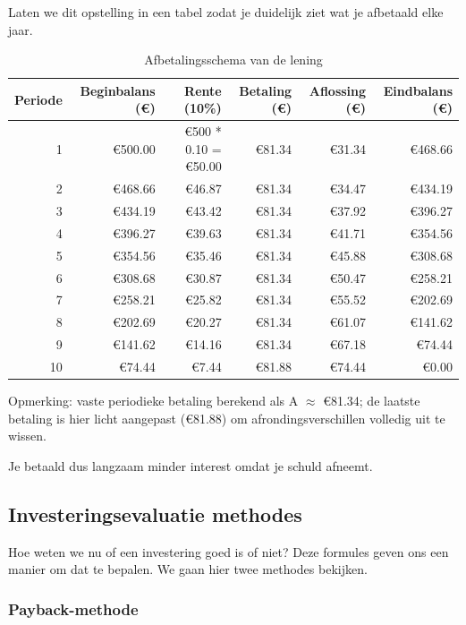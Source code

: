 \documentclass[a4paper,11pt]{article}
\begin{document}
    Laten we dit opstelling in een tabel zodat je duidelijk ziet wat je afbetaald elke jaar.
    \begin{table}[H]
        \centering
        \caption{Afbetalingsschema van de lening}
        \begin{tabular}{r r r r r r}
            \toprule
            Periode & Beginbalans (€) & Rente (10\%) & Betaling (€) & Aflossing (€) & Eindbalans (€) \\ 
            \midrule
            1  & €500.00 & €500 * 0.10 = €50.00 & €81.34 & €31.34 & €468.66 \\
            2  & €468.66 & €46.87 & €81.34 & €34.47 & €434.19 \\
            3  & €434.19 & €43.42 & €81.34 & €37.92 & €396.27 \\
            4  & €396.27 & €39.63 & €81.34 & €41.71 & €354.56 \\
            5  & €354.56 & €35.46 & €81.34 & €45.88 & €308.68 \\
            6  & €308.68 & €30.87 & €81.34 & €50.47 & €258.21 \\
            7  & €258.21 & €25.82 & €81.34 & €55.52 & €202.69 \\
            8  & €202.69 & €20.27 & €81.34 & €61.07 & €141.62 \\
            9  & €141.62 & €14.16 & €81.34 & €67.18 & €74.44 \\
            10 & €74.44  & €7.44  & €81.88 & €74.44 & €0.00 \\
        \end{tabular}
    \end{table}

    Opmerking: vaste periodieke betaling berekend als A
     $\approx$ €81.34; de laatste betaling is hier licht aangepast (€81.88) om afrondingsverschillen volledig uit te wissen.

    Je betaald dus langzaam minder interest omdat je schuld afneemt.
    \newline
    

\subsection{Investeringsevaluatie methodes}
 Hoe weten we nu of een investering goed is of niet?
 Deze formules geven ons een manier om dat te bepalen.
 We gaan hier twee methodes bekijken.

    \subsubsection{Payback-methode}
\end{document}
